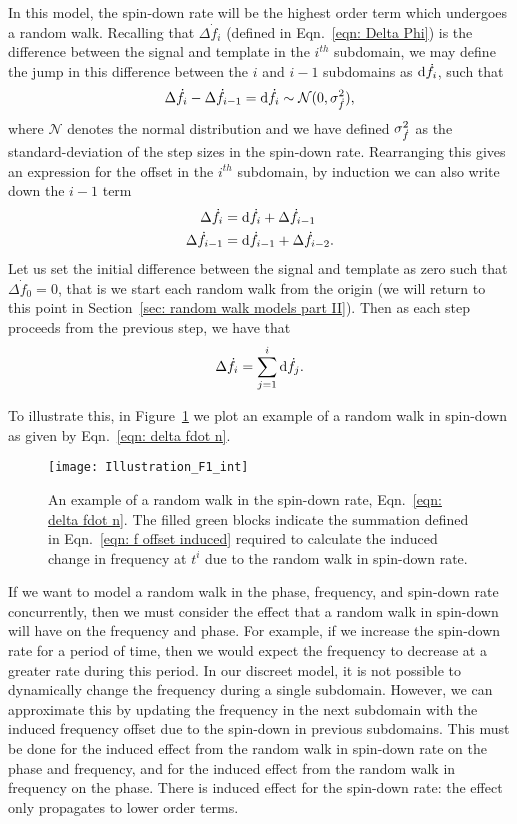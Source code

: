 \documentclass[../full_thesis/full_thesis.tex]{subfiles}
\begin{document}
In this model, the spin-down rate will be the highest order term which
undergoes a random walk. Recalling that $\Delta \dot{f}_i$ (defined in
Eqn.~\eqref{eqn: Delta Phi}) is the difference between the signal and template
in the $i^{th}$ subdomain, we may define the jump in this difference between
the $i$ and $i-1$ subdomains as $\mathrm{d} \dot{f}_i$, such that
\begin{equation}
\Delta \dot{f}_{i} - \Delta\dot{f}_{i-1} = \mathrm{d} \dot{f}_{i} \sim \mathcal{N}(0, \sigma_{\dot{f}}^{2}),
\label{eqn: fdot N}
\end{equation}
where $\mathcal{N}$ denotes the normal distribution and we have defined $\sigma_{\dot{f}}^{2}$
as the standard-deviation of the step sizes in the spin-down rate. Rearranging
this gives an expression for the offset in the
$i^{th}$ subdomain, by induction we can also write down the $i-1$ term
\begin{align}
\Delta\dot{f}_{i} &  = \mathrm{d}\dot{f}_{i} + \Delta\dot{f}_{i-1}  \\
\Delta\dot{f}_{i-1} &  = \mathrm{d}\dot{f}_{i-1} + \Delta\dot{f}_{i-2}  .
\end{align}
Let us set the initial difference between the signal and template as zero such
that $\Delta\dot{f}_0=0$, that is we start each random walk from the origin
(we will return to this point in Section~\ref{sec: random walk models part
II}). Then as each step proceeds from the previous step, we have that
\begin{equation} 
\Delta\dot{f}_{i} = \sum_{j=1}^{i}\mathrm{d}\dot{f}_{j}.
\label{eqn: delta fdot n} 
\end{equation}

To illustrate this, in Figure~\ref{fig: Illustration fdot int} we plot an example
of a random walk in spin-down as given by Eqn.~\eqref{eqn: delta fdot n}.
\begin{figure}[ht]
\centering
\texttt{[image: Illustration\_F1\_int]}
\caption{An example of a random walk in the spin-down rate, 
Eqn.~\eqref{eqn: delta fdot n}. The filled green blocks indicate the
summation defined in Eqn.~\eqref{eqn: f offset induced} required to
calculate the induced change in frequency at $t^{i}$ due to the random walk in
spin-down rate.}
\label{fig: Illustration fdot int}
\end{figure}

If we want to model a random walk in the phase, frequency, and spin-down rate
concurrently, then we must consider the effect that a
random walk in spin-down will have on the frequency and phase. For example, if we
increase the spin-down rate for a period of time, then we would expect the frequency
to decrease at a greater rate during this period. In our discreet model, it is
not possible to dynamically change the frequency during a single subdomain.
However, we can approximate this by updating the frequency in the next
subdomain with the induced frequency offset due to the spin-down in previous
subdomains. This must be done for the induced effect from the random walk in spin-down rate on
the phase and frequency, and for the induced effect from the random walk in frequency
on the phase. There is induced effect for the spin-down rate: the effect only
propagates to lower order terms.
\end{document}
